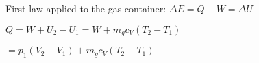 First law applied to the gas container:  
\( \Delta E = Q - W = \Delta U \)  

\( Q = W + U_2 - U_1 = W + m_g c_V (T_2 - T_1) \)  

\( = p_1 (V_2 - V_1) + m_g c_V (T_2 - T_1) \)